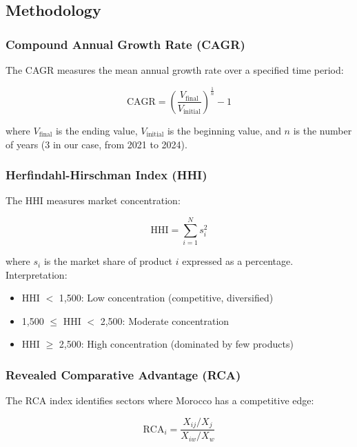 \documentclass[12pt,a4paper]{article}
\begin{document}
\subsection{Methodology}

\subsubsection{Compound Annual Growth Rate (CAGR)}

The CAGR measures the mean annual growth rate over a specified time period:

\begin{equation}
\text{CAGR} = \left(\frac{V_{\text{final}}}{V_{\text{initial}}}\right)^{\frac{1}{n}} - 1
\end{equation}

where $V_{\text{final}}$ is the ending value, $V_{\text{initial}}$ is the beginning value, and $n$ is the number of years (3 in our case, from 2021 to 2024).

\subsubsection{Herfindahl-Hirschman Index (HHI)}

The HHI measures market concentration:

\begin{equation}
\text{HHI} = \sum_{i=1}^{N} s_i^2
\end{equation}

where $s_i$ is the market share of product $i$ expressed as a percentage. Interpretation:
\begin{itemize}
\item HHI $<$ 1,500: Low concentration (competitive, diversified)
\item 1,500 $\leq$ HHI $<$ 2,500: Moderate concentration
\item HHI $\geq$ 2,500: High concentration (dominated by few products)
\end{itemize}

\subsubsection{Revealed Comparative Advantage (RCA)}

The RCA index identifies sectors where Morocco has a competitive edge:

\begin{equation}
\text{RCA}_i = \frac{X_{ij} / X_j}{X_{iw} / X_w}
\end{equation}
\end{document}
